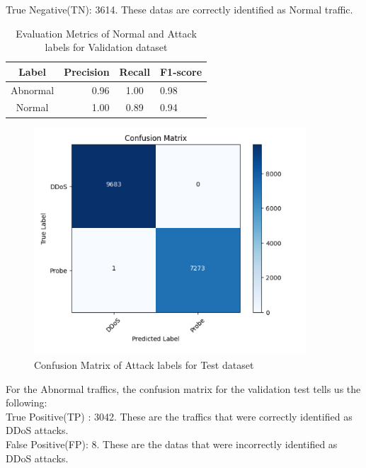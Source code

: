 True Negative(TN): 3614. These datas are correctly identified as Normal traffic.\\
\begin{table}[tbh]
	\centering
	\begin{tabular}{|c|r|c|l|} %
		\hline %
		Label  &Precision &Recall &F1-score \\
		\hline %
		Abnormal &0.96 &1.00 &0.98 \\
		\hline %
		Normal &1.00 &0.89 &0.94\\
		\hline
	\end{tabular}
	\caption{Evaluation Metrics of Normal and Attack labels for Validation dataset}
	\label{Evaluation Metrics of Normal and Attack labels for validation dataset}
\end{table}
\begin{figure}[tbh] %
	\begin{center}
		\includegraphics[width=4in]{images/confusion_matrix_attack-ezgif.com-webp-to-png-converter.png} 
		\caption{Confusion Matrix of Attack labels for Test dataset} %
		\label{Confusion Matrix of Attack labels for Test dataset} 
	\end{center}
\end{figure}
For the Abnormal traffics, the confusion matrix for the validation test tells us the following:\\ 
True Positive(TP) : 3042. These are the traffics that were correctly identified as DDoS attacks.\\
False Positive(FP): 8. These are the datas that were incorrectly identified as DDoS attacks.\\
